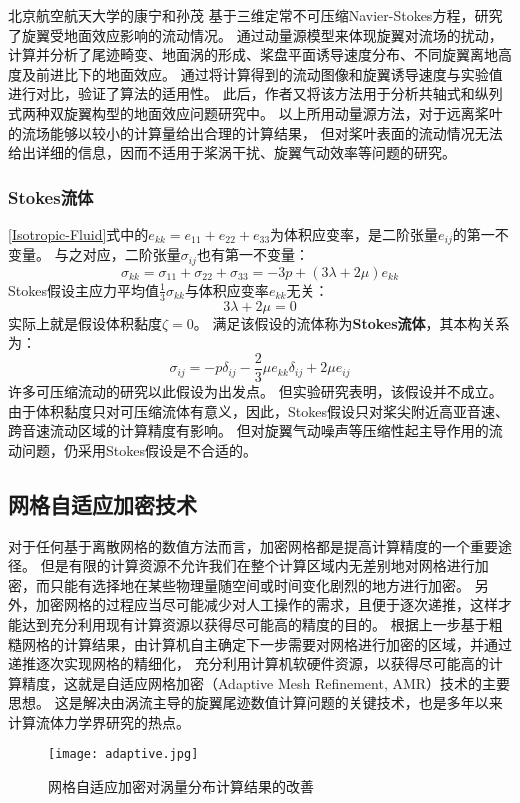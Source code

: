 北京航空航天大学的康宁和孙茂
基于三维定常不可压缩Navier-Stokes方程，研究了旋翼受地面效应影响的流动情况。
通过动量源模型来体现旋翼对流场的扰动，计算并分析了尾迹畸变、地面涡的形成、桨盘平面诱导速度分布、不同旋翼离地高度及前进比下的地面效应。
通过将计算得到的流动图像和旋翼诱导速度与实验值进行对比，验证了算法的适用性。
此后，作者又将该方法用于分析共轴式和纵列式两种双旋翼构型的地面效应问题研究中。
以上所用动量源方法，对于远离桨叶的流场能够以较小的计算量给出合理的计算结果，
但对桨叶表面的流动情况无法给出详细的信息，因而不适用于桨涡干扰、旋翼气动效率等问题的研究。

\subsubsection{Stokes流体}
\ref{Isotropic-Fluid}式中的$e_{kk}=e_{11}+e_{22}+e_{33}$为体积应变率，是二阶张量$e_{ij}$的第一不变量。
与之对应，二阶张量$\sigma_{ij}$也有第一不变量：
\begin{equation}\label{}
\sigma_{kk}
=
\sigma_{11}+\sigma_{22}+\sigma_{33}
=
-3p
+\left( 3\lambda + 2\mu \right) e_{kk}
\end{equation}
Stokes假设主应力平均值$\frac{1}{3}\sigma_{kk}$与体积应变率$e_{kk}$无关：
\begin{equation}\label{}
3\lambda + 2\mu = 0
\end{equation}
实际上就是假设体积黏度$\zeta = 0$。
满足该假设的流体称为\textbf{Stokes流体}，其本构关系为：
\begin{equation}\label{Stokes-Fluid}
\sigma_{ij}
=
-p\delta_{ij}
-\frac{2}{3}\mu  e_{kk} \delta_{ij}
+2\mu  e_{ij}
\end{equation}
许多可压缩流动的研究以此假设为出发点。
但实验研究表明，该假设并不成立。
由于体积黏度只对可压缩流体有意义，因此，Stokes假设只对桨尖附近高亚音速、跨音速流动区域的计算精度有影响。
但对旋翼气动噪声等压缩性起主导作用的流动问题，仍采用Stokes假设是不合适的。

\subsection{网格自适应加密技术}
对于任何基于离散网格的数值方法而言，加密网格都是提高计算精度的一个重要途径。
但是有限的计算资源不允许我们在整个计算区域内无差别地对网格进行加密，而只能有选择地在某些物理量随空间或时间变化剧烈的地方进行加密。
另外，加密网格的过程应当尽可能减少对人工操作的需求，且便于逐次递推，这样才能达到充分利用现有计算资源以获得尽可能高的精度的目的。
根据上一步基于粗糙网格的计算结果，由计算机自主确定下一步需要对网格进行加密的区域，并通过递推逐次实现网格的精细化，
充分利用计算机软硬件资源，以获得尽可能高的计算精度，这就是自适应网格加密（Adaptive Mesh Refinement, AMR）技术的主要思想。
这是解决由涡流主导的旋翼尾迹数值计算问题的关键技术，也是多年以来计算流体力学界研究的热点。
\begin{figure}[t!]
    \centering
    \texttt{[image: adaptive.jpg]}
    \caption{网格自适应加密对涡量分布计算结果的改善}
\end{figure}

